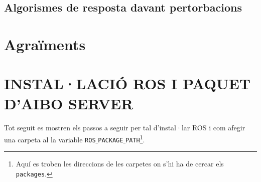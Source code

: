 \documentclass[12pt,a4paper,final,twoside]{article}
\begin{document}
\label{Algorismes}
\subsection{Algorismes de resposta davant pertorbacions}




\newpage
\section*{Agraïments}

\newpage


\label{Referencies}


\appendix
\clearpage %
\addappheadtotoc
\appendixpage
\section{INSTAL·LACIÓ ROS I PAQUET D'AIBO SERVER}

\paragraph{}Tot seguit es mostren els passos a seguir per tal d'instal·lar ROS i com afegir una carpeta al la variable \texttt{ROS$\_$PACKAGE$\_$PATH}\footnote{Aquí es troben les direccions de les carpetes on s'hi ha de cercar els \texttt{packages}.}.
\end{document}
